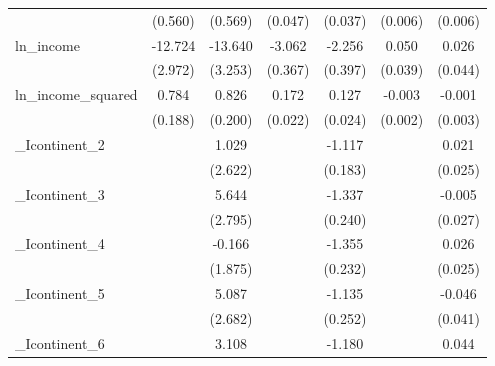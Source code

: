 {\begin{tabular}{l*{6}{c}}
            &     (0.560)         &     (0.569)         &     (0.047)         &     (0.037)         &     (0.006)         &     (0.006)         \\
[1em]
ln\_income   &     -12.724\sym{***}&     -13.640\sym{***}&      -3.062\sym{***}&      -2.256\sym{***}&       0.050         &       0.026         \\
            &     (2.972)         &     (3.253)         &     (0.367)         &     (0.397)         &     (0.039)         &     (0.044)         \\
[1em]
ln\_income\_squared&       0.784\sym{***}&       0.826\sym{***}&       0.172\sym{***}&       0.127\sym{***}&      -0.003         &      -0.001         \\
            &     (0.188)         &     (0.200)         &     (0.022)         &     (0.024)         &     (0.002)         &     (0.003)         \\
[1em]
\_Icontinent\_2&                     &       1.029         &                     &      -1.117\sym{***}&                     &       0.021         \\
            &                     &     (2.622)         &                     &     (0.183)         &                     &     (0.025)         \\
[1em]
\_Icontinent\_3&                     &       5.644\sym{*}  &                     &      -1.337\sym{***}&                     &      -0.005         \\
            &                     &     (2.795)         &                     &     (0.240)         &                     &     (0.027)         \\
[1em]
\_Icontinent\_4&                     &      -0.166         &                     &      -1.355\sym{***}&                     &       0.026         \\
            &                     &     (1.875)         &                     &     (0.232)         &                     &     (0.025)         \\
[1em]
\_Icontinent\_5&                     &       5.087         &                     &      -1.135\sym{***}&                     &      -0.046         \\
            &                     &     (2.682)         &                     &     (0.252)         &                     &     (0.041)         \\
[1em]
\_Icontinent\_6&                     &       3.108         &                     &      -1.180\sym{***}&                     &       0.044         \\

\end{tabular}}
